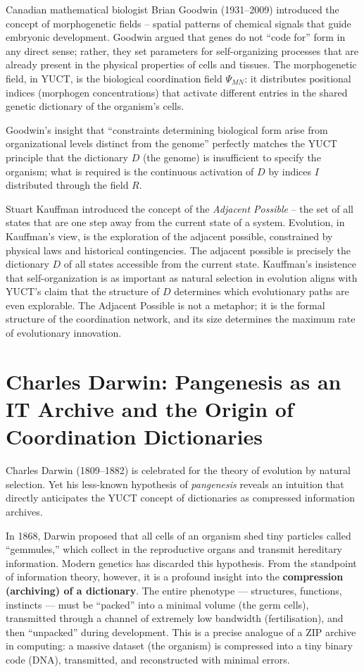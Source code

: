 \documentclass[12pt,a4paper]{article}
\begin{document}
	Canadian mathematical biologist Brian Goodwin (1931–2009) introduced the concept of morphogenetic fields -- spatial patterns of chemical signals that guide embryonic development. Goodwin argued that genes do not ``code for'' form in any direct sense; rather, they set parameters for self-organizing processes that are already present in the physical properties of cells and tissues. The morphogenetic field, in YUCT, is the biological coordination field \(\Psi_{MN}\): it distributes positional indices (morphogen concentrations) that activate different entries in the shared genetic dictionary of the organism's cells.
	
	Goodwin's insight that ``constraints determining biological form arise from organizational levels distinct from the genome'' perfectly matches the YUCT principle that the dictionary \(D\) (the genome) is insufficient to specify the organism; what is required is the continuous activation of \(D\) by indices \(I\) distributed through the field \(R\).
	
	Stuart Kauffman introduced the concept of the \emph{Adjacent Possible} -- the set of all states that are one step away from the current state of a system. Evolution, in Kauffman's view, is the exploration of the adjacent possible, constrained by physical laws and historical contingencies. The adjacent possible is precisely the dictionary \(D\) of all states accessible from the current state. Kauffman's insistence that self-organization is as important as natural selection in evolution aligns with YUCT's claim that the structure of \(D\) determines which evolutionary paths are even explorable. The Adjacent Possible is not a metaphor; it is the formal structure of the coordination network, and its size determines the maximum rate of evolutionary innovation.
	
	\section{Charles Darwin: Pangenesis as an IT Archive and the Origin of Coordination Dictionaries}
	
	Charles Darwin (1809–1882) is celebrated for the theory of evolution by natural selection. Yet his less-known hypothesis of \emph{pangenesis} reveals an intuition that directly anticipates the YUCT concept of dictionaries as compressed information archives.
	
	In 1868, Darwin proposed that all cells of an organism shed tiny particles called ``gemmules,'' which collect in the reproductive organs and transmit hereditary information. Modern genetics has discarded this hypothesis. From the standpoint of information theory, however, it is a profound insight into the \textbf{compression (archiving) of a dictionary}. The entire phenotype — structures, functions, instincts — must be ``packed'' into a minimal volume (the germ cells), transmitted through a channel of extremely low bandwidth (fertilisation), and then ``unpacked'' during development. This is a precise analogue of a ZIP archive in computing: a massive dataset (the organism) is compressed into a tiny binary code (DNA), transmitted, and reconstructed with minimal errors.
	
\end{document}
